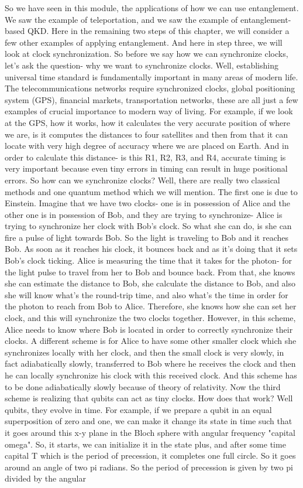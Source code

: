 So we have seen in this module, the applications of how we can use entanglement. We saw the example of teleportation, and we saw the example of entanglement-based QKD. Here in the remaining two steps of this chapter, we will consider a few other examples of applying entanglement. And here in step three, we will look at clock synchronization. So before we say how we can synchronize clocks, let's ask the question- why we want to synchronize clocks. Well, establishing universal time standard is fundamentally important in many areas of modern life. The telecommunications networks require synchronized clocks, global positioning system (GPS), financial markets, transportation networks, these are all just a few examples of crucial importance to modern way of living. For example, if we look at the GPS, how it works, how it calculates the very accurate position of where we are, is it computes the distances to four satellites and then from that it can locate with very high degree of accuracy where we are placed on Earth. And in order to calculate this distance- is this R1, R2, R3, and R4, accurate timing is very important because even tiny errors in timing can result in huge positional errors. So how can we synchronize clocks? Well, there are really two classical methods and one quantum method which we will mention. The first one is due to Einstein. Imagine that we have two clocks- one is in possession of Alice and the other one is in possession of Bob, and they are trying to synchronize- Alice is trying to synchronize her clock with Bob's clock. So what she can do, is she can fire a pulse of light towards Bob. So the light is traveling to Bob and it reaches Bob. As soon as it reaches his clock, it bounces back and as it's doing that it sets Bob's clock ticking. Alice is measuring the time that it takes for the photon- for the light pulse to travel from her to Bob and bounce back. From that, she knows she can estimate the distance to Bob, she calculate the distance to Bob, and also she will know what's the round-trip time, and also what's the time in order for the photon to reach from Bob to Alice. Therefore, she knows how she can set her clock, and this will synchronize the two clocks together. However, in this scheme, Alice needs to know where Bob is located in order to correctly synchronize their clocks. A different scheme is for Alice to have some other smaller clock which she synchronizes locally with her clock, and then the small clock is very slowly, in fact adiabatically slowly, transferred to Bob where he receives the clock and then he can locally synchronize his clock with this received clock. And this scheme has to be done adiabatically slowly because of theory of relativity. Now the third scheme is realizing that qubits can act as tiny clocks. How does that work? Well qubits, they evolve in time. For example, if we prepare a qubit in an equal superposition of zero and one, we can make it change its state in time such that it goes around this x-y plane in the Bloch sphere with angular frequency "capital omega". So, it starts, we can initialize it in the state plus, and after some time capital T which is the period of precession, it completes one full circle. So it goes around an angle of two pi radians. So the period of precession is given by two pi divided by the angular 